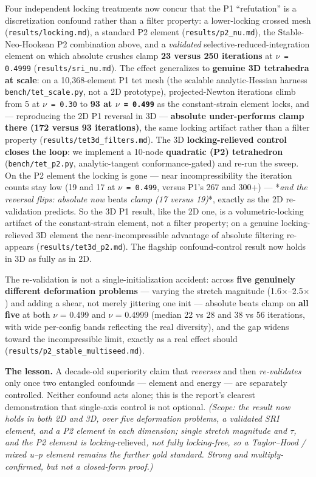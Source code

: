\documentclass{egpubl}
\begin{document}
Four independent locking treatments now concur that the P1 ``refutation'' is a discretization confound
rather than a filter property: a lower-locking crossed mesh (\texttt{results/locking.md}), a standard P2
element (\texttt{results/p2\_nu.md}), the Stable-Neo-Hookean P2 combination above, and a \emph{validated}
selective-reduced-integration element on which absolute crushes clamp \textbf{23 versus 250 iterations} at
\texttt{$\nu$ = 0.4999} (\texttt{results/sri\_nu.md}). The effect generalizes to \textbf{genuine 3D tetrahedra at scale}: on a
10,368-element P1 tet mesh (the scalable analytic-Hessian harness \texttt{bench/tet\_scale.py}, not a 2D
prototype), projected-Newton iterations climb from 5 at \texttt{$\nu$ = 0.30} to \textbf{93 at \texttt{$\nu$ = 0.499}} as the
constant-strain element locks, and --- reproducing the 2D P1 reversal in 3D --- \textbf{absolute under-performs
clamp there (172 versus 93 iterations)}, the same locking artifact rather than a filter property
(\texttt{results/tet3d\_filters.md}). The 3D \textbf{locking-relieved control closes the loop}: we implement a
10-node \textbf{quadratic (P2) tetrahedron} (\texttt{bench/tet\_p2.py}, analytic-tangent conformance-gated) and
re-run the sweep. On the P2 element the locking is gone --- near incompressibility the iteration counts
stay low (19 and 17 at \texttt{$\nu$ = 0.499}, versus P1's 267 and 300+) --- *\emph{and the reversal flips: absolute now
}beats\emph{ clamp (17 versus 19)}*, exactly as the 2D re-validation predicts. So the 3D P1 result, like the
2D one, is a volumetric-locking artifact of the constant-strain element, not a filter property; on a
genuine locking-relieved 3D element the near-incompressible advantage of absolute filtering re-appears
(\texttt{results/tet3d\_p2.md}). The flagship confound-control result now holds in 3D as fully as in 2D.

The re-validation is not a single-initialization accident: across \textbf{five genuinely different
deformation problems} --- varying the stretch magnitude (1.6$\times$--2.5$\times$) and adding a shear, not merely
jittering one init --- absolute beats clamp on \textbf{all five} at both $\nu$ = 0.499 and $\nu$ = 0.4999 (median 22
vs 28 and 38 vs 56 iterations, with wide per-config bands reflecting the real diversity), and the gap
widens toward the incompressible limit, exactly as a real effect should
(\texttt{results/p2\_stable\_multiseed.md}).

\textbf{The lesson.} A decade-old superiority claim that \emph{reverses} and then \emph{re-validates} only once two
entangled confounds --- element and energy --- are separately controlled. Neither confound acts alone;
this is the report's clearest demonstration that single-axis control is not optional. \emph{(Scope: the
result now holds in both 2D and 3D, over five deformation problems, a validated SRI element, and a P2
element in each dimension; single stretch magnitude and $\tau$, and the P2 element is locking-}relieved\emph{,
not fully locking-free, so a Taylor--Hood / mixed u--p element remains the further gold standard. Strong
and multiply-confirmed, but not a closed-form proof.)}
\end{document}
